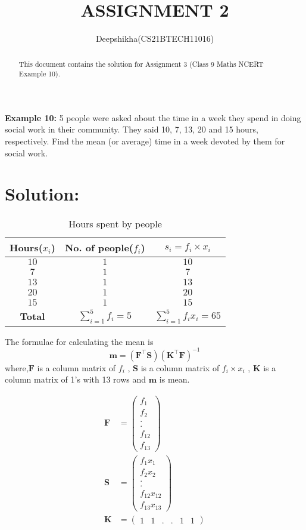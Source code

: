 \documentclass[journal, 12pt, twocolumn]{IEEEtran}
\let\vec\mathbf
\newcommand{\myvec}[1]{\ensuremath{\begin{pmatrix}#1\end{pmatrix}}}
\providecommand{\brak}[1]{\ensuremath{\left(#1\right)}}
\begin{document}
\title{ASSIGNMENT 2}
\author{Deepshikha(CS21BTECH11016)}
\maketitle

\begin{abstract}
This document contains the solution for Assignment 3 (Class 9 Maths NCERT Example 10).
\end{abstract}

\textbf{Example 10:}
5 people were asked about the time in a week they spend in doing
social work in their community. They said 10, 7, 13, 20 and 15 hours, respectively.
Find the mean (or average) time in a week devoted by them for social work.

\section*{\textbf{Solution:}}
\begin{table}[!ht]
    \centering
    \begin{tabular}{|c|c|c|}
    \hline
     Hours($x_{i}$) & No. of people($f_{i}$) & $ s_{i} = f_{i}\times x_{i}$\\
     \hline
     $10$ & $1$ & $10$\\
     $7$  & $1$ & $7$\\
     $13$ & $1$ & $13$\\
     $20$ & $1$ & $20$\\
     $15$ & $1$ & $15$\\
     \hline
    \textbf{Total} & $\sum_{i=1}^{5} f_{i} = 5$ & $\sum_{i=1}^{5} f_{i}x_{i} = 65$ \\
    \hline
    \end{tabular}
    \caption{Hours spent by people}
    \label{table:Table 1}
\end{table}
The formulae for calculating the mean is 
\begin{equation}
\label{eq:formulae}
    \vec{m} = \brak{\vec{F^{\top}}\vec{S}}\brak{\vec{K^{\top}}\vec{F}}^{-1}
\end{equation}
where,$\vec{F}$ is a column matrix of $f_{i}$ , $\vec{S}$ is a column matrix of $f_{i}\times x_{i}$ , $\vec{K}$ is a column matrix of 1's with 13 rows and $\vec{m}$ is mean.


\begin{align}
    	 \label{eq:formulae2}
	      	\vec{F}&=\myvec{f_{1}\\f_{2}\\.\\.\\f_{12}\\f_{13}}\\
	     \label{eq:formulae3}
	      	\vec{S}&=\myvec{f_{1}x_{1}\\f_{2}x_{2}\\.\\.\\f_{12}x_{12}\\f_{13}x_{13}}\\
	     \label{eq:formulae4}
      		\vec{K}&=\myvec{1 & 1 & . & . & 1 & 1}
    \end{align}
    
\end{document}
